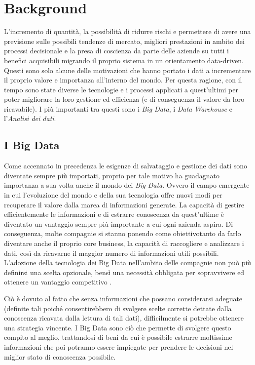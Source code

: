 \chapter{Background}
\label{ch:Background}

L'incremento di quantità, la possibilità di ridurre rischi e permettere di avere una previsione sulle possibili tendenze di mercato, migliori prestazioni in ambito dei processi decisionale e la presa di coscienza da parte delle aziende su tutti i benefici acquisibili migrando il proprio sistema in un orientamento data-driven. Questi sono solo alcune delle motivazioni che hanno portato i dati a incrementare il proprio valore e importanza all'interno del mondo. Per questa ragione, con il tempo sono state diverse le tecnologie e i processi applicati a quest'ultimi per poter migliorare la loro gestione ed efficienza (e di conseguenza il valore da loro ricavabile). I più importanti tra questi sono i \textit{Big Data}, i \textit{Data Warehouse} e l'\textit{Analisi dei dati}.

\section{I Big Data}

Come accennato in precedenza le esigenze di salvataggio e gestione dei dati sono diventate sempre più importati, proprio per tale motivo ha guadagnato importanza a sua volta anche il mondo dei \textit{Big Data}. Ovvero il campo emergente in cui l'evoluzione del mondo e della sua tecnologia offre nuovi modi per recuperare il valore dalla marea di informazioni generate. La capacità di gestire efficientemente le informazioni e di estrarre conoscenza da quest'ultime è diventato un vantaggio sempre più importante a cui ogni azienda aspira. Di conseguenza, molte compagnie si stanno ponendo come obiettivotanto da farlo diventare anche il proprio core business, la capacità di raccogliere e analizzare i dati, così da ricavarne il maggior numero di informazioni utili possibili. L'adozione della tecnologia dei Big Data nell'ambito delle compagnie non può più definirsi una scelta opzionale, bensì una necessità obbligata per sopravvivere ed ottenere un vantaggio competitivo \cite{new_horizon_for_a_data_driven_economy}.

Ciò è dovuto al fatto che senza informazioni che possano considerarsi adeguate (definite tali poiché consentirebbero di svolgere scelte corrette dettate dalla conoscenza ricavata dalla lettura di tali dati), difficilmente si potrebbe ottenere una strategia vincente. I Big Data sono ciò che permette di svolgere questo compito al meglio, trattandosi di beni da cui è possibile estrarre moltissime informazioni che poi potranno essere impiegate per prendere le decisioni nel miglior stato di conoscenza possibile.

